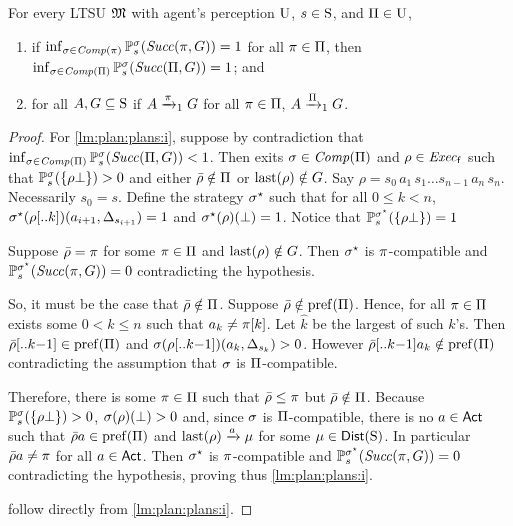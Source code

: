 \begin{lemma}\label{lm:plan:plans}
  For every LTSU $\model$ with agent's perception $\Unc$, $s\in\S$,
  and $\plans\in\Unc$,
  \begin{enumerate}
  \item\label{lm:plan:plans:i}%
    if $\inf_{\strat\in\Comp(\plan)}\Prob^\strat_s(\Succ(\plan,G))=1$
    for all $\plan\in\plans$, then
    $\inf_{\strat\in\Comp(\plans)}\Prob^\strat_s(\Succ(\plans,G))=1$; and
  \item\label{lm:plan:plans:ii}%
    for all $A,G\subseteq\S$ if $A\reach{\plan}_1G$ for all
    $\plan\in\plans$, $A\reach{\plans}_1G$.
  \end{enumerate}

\end{lemma}
%
\begin{proof}
  For \cref{lm:plan:plans:i}, suppose by contradiction that
  $\inf_{\strat\in\Comp(\plans)}\Prob^\strat_s(\Succ(\plans,G))<1$.
  Then exits $\strat\in\Comp(\plans)$ and $\rho\in\execf$ such that
  $\Prob^\strat_s(\{\rho\complete\})>0$ and either
  $\bar{\rho}\notin\plans$ or $\last(\rho)\notin G$.
  Say $\rho=s_0\, a_1\, s_1\ldots s_{n-1}\, a_n\, s_n$.  Necessarily
  $s_0=s$.
  Define the strategy $\strat^\star$ such that for all $0\leq k<n$,
  $\strat^\star(\rho[..k])(a_{i+1},\Dirac_{s_{i+1}})=1$ and
  $\strat^\star(\rho)(\complete)=1$.  Notice that
  $\Prob^{\strat^\star}_s(\{\rho\complete\})=1$

  Suppose $\bar{\rho}=\plan$ for some $\plan\in\plans$ and
  $\last(\rho)\notin G$.  Then $\strat^\star$ is $\plan$-compatible
  and $\Prob^{\strat^\star}_s(\Succ(\plan,G))=0$ contradicting the
  hypothesis.

  So, it must be the case that $\bar{\rho}\notin\plans$.
  Suppose $\bar{\rho}\notin\pref(\plans)$.  Hence, for all
  $\plan\in\plans$ exists some $0<k\leq n$ such that
  $a_k\neq\plan[k]$.  Let $\hat{k}$ be the largest of such $k$'s.
  Then $\bar{\rho}[..k{-}1]\in\pref(\plans)$ and
  $\strat(\rho[..k{-}1])(a_k,\Dirac_{s_k})>0$.  However
  $\bar{\rho}[..k{-}1]a_k\notin\pref(\plans)$ contradicting the
  assumption that $\strat$ is $\plans$-compatible.

  Therefore, there is some $\plan\in\plans$ such that
  $\bar{\rho}\leq\plan$ but $\bar{\rho}\notin\plans$.
  Because $\Prob^\strat_s(\{\rho\complete\})>0$,
  $\strat(\rho)(\complete)>0$ and, since $\strat$ is
  $\plans$-compatible, there is no $a\in\Act$ such that
  $\bar{\rho}a\in\pref(\plans)$ and $\last(\rho)\reach{a}\mu$ for some
  $\mu\in\Dist(\S)$.
  In particular $\bar{\rho}a\neq\plan$ for all $a\in\Act$.  Then
  $\strat^\star$ is $\plan$-compatible and
  $\Prob^{\strat^\star}_s(\Succ(\plan,G))=0$ contradicting the
  hypothesis, proving thus \cref{lm:plan:plans:i}.

   follow directly from \cref{lm:plan:plans:i}.
\end{proof}


